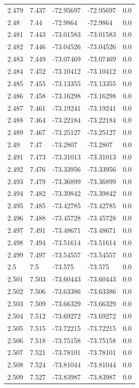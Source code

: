 \begin{tabular}{lllll}
2.479 & 7.437 & -72.95697 & -72.95697 & 0.0 \\
2.48 & 7.44 & -72.9864 & -72.9864 & 0.0 \\
2.481 & 7.443 & -73.01583 & -73.01583 & 0.0 \\
2.482 & 7.446 & -73.04526 & -73.04526 & 0.0 \\
2.483 & 7.449 & -73.07469 & -73.07469 & 0.0 \\
2.484 & 7.452 & -73.10412 & -73.10412 & 0.0 \\
2.485 & 7.455 & -73.13355 & -73.13355 & 0.0 \\
2.486 & 7.458 & -73.16298 & -73.16298 & 0.0 \\
2.487 & 7.461 & -73.19241 & -73.19241 & 0.0 \\
2.488 & 7.464 & -73.22184 & -73.22184 & 0.0 \\
2.489 & 7.467 & -73.25127 & -73.25127 & 0.0 \\
2.49 & 7.47 & -73.2807 & -73.2807 & 0.0 \\
2.491 & 7.473 & -73.31013 & -73.31013 & 0.0 \\
2.492 & 7.476 & -73.33956 & -73.33956 & 0.0 \\
2.493 & 7.479 & -73.36899 & -73.36899 & 0.0 \\
2.494 & 7.482 & -73.39842 & -73.39842 & 0.0 \\
2.495 & 7.485 & -73.42785 & -73.42785 & 0.0 \\
2.496 & 7.488 & -73.45728 & -73.45728 & 0.0 \\
2.497 & 7.491 & -73.48671 & -73.48671 & 0.0 \\
2.498 & 7.494 & -73.51614 & -73.51614 & 0.0 \\
2.499 & 7.497 & -73.54557 & -73.54557 & 0.0 \\
2.5 & 7.5 & -73.575 & -73.575 & 0.0 \\
2.501 & 7.503 & -73.60443 & -73.60443 & 0.0 \\
2.502 & 7.506 & -73.63386 & -73.63386 & 0.0 \\
2.503 & 7.509 & -73.66329 & -73.66329 & 0.0 \\
2.504 & 7.512 & -73.69272 & -73.69272 & 0.0 \\
2.505 & 7.515 & -73.72215 & -73.72215 & 0.0 \\
2.506 & 7.518 & -73.75158 & -73.75158 & 0.0 \\
2.507 & 7.521 & -73.78101 & -73.78101 & 0.0 \\
2.508 & 7.524 & -73.81044 & -73.81044 & 0.0 \\
2.509 & 7.527 & -73.83987 & -73.83987 & 0.0 \\

\end{tabular}
